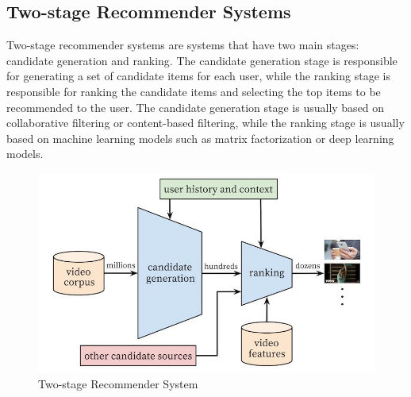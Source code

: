 \subsection*{Two-stage Recommender Systems}
Two-stage recommender systems are systems that have two main stages: candidate generation and ranking. The candidate generation stage is responsible for generating a set of candidate items for each user, while the ranking stage is responsible for ranking the candidate items and selecting the top items to be recommended to the user. The candidate generation stage is usually based on collaborative filtering or content-based filtering, while the ranking stage is usually based on machine learning models such as matrix factorization or deep learning models.\cite{MultiStageRecSys}
\begin{figure}[H]
    \centering
    \includegraphics[width=1\textwidth]{assets/Two_stage_rec_sys.jpg}
    \caption{Two-stage Recommender System\cite{MultiStageRecSys}}
\end{figure}
